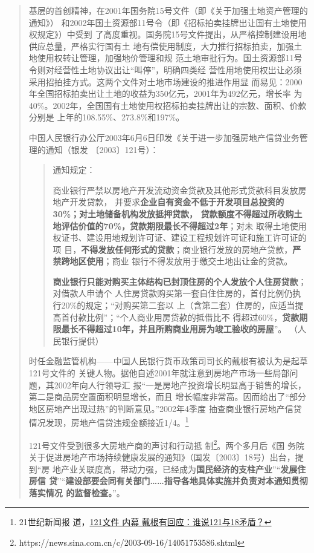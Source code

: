 \begin{quotation}
  基层的首创精神，在2001年国务院15号文件（即《关于加强土地资产管理的通知》）
  和2002年国土资源部11号令（即《招标拍卖挂牌出让国有土地使用权规定》）中受到
  了高度重视。国务院15号文件提出，从严格控制建设用地供应总量，严格实行国有土
  地有偿使用制度，大力推行招标拍卖，加强土地使用权转让管理，加强地价管理和规
  范土地审批行为。国土资源部11号令则对经营性土地协议出让“叫停”，明确四类经
  营性用地使用权出让必须采用招拍挂方式。这两个文件对土地市场建设的推进作用显
  而易见：2000年全国招标拍卖出让土地的收益为350亿元，2001年为492亿元，增长率
  为40\%。2002年，全国国有土地使用权招标拍卖挂牌出让的宗数、面积、价款分别是
  上年的108.55\%、273.8\%和197\%。



中国人民银行办公厅2003年6月6日印发《关于进一步加强房地产信贷业务管理的通知（银发
〔2003〕121号）：
\begin{quotation}
  通知规定：

  商业银行严禁以房地产开发流动资金贷款及其他形式贷款科目发放房地产开发贷款，
  并要求\textbf{企业自有资金不低于开发项目总投资的30\%；对土地储备机构发放抵押贷款，
    贷款额度不得超过所收购土地评估价值的70\%，贷款期限最长不得超过2年}；对未
  取得土地使用权证书、建设用地规划许可证、建设工程规划许可证和施工许可证的项
  目，\textbf{不得发放任何形式的贷款}；商业银行发放的房地产贷款，\textbf{严禁跨地区使用}；商业
  银行不得发放用于缴交土地出让金的贷款。

  \textbf{商业银行只能对购买主体结构已封顶住房的个人发放个人住房贷款}；对借款人申请个
  人住房贷款购买第一套自住住房的，首付比例仍执行20\%的规定；“对购买第二套以
  上（含第二套）住房的，应适当提高首付款比例”；“个人商业用房贷款的抵借比不
  得超过60\%，\textbf{贷款期限最长不得超过10年，并且所购商业用房为竣工验收的房屋}”。
  （人民银行提供）
\end{quotation}
时任金融监管机构——中国人民银行货币政策司司长的戴根有被认为是起草121号文件的
关键人物。据他自述2001年就注意到房地产市场一些局部问题，其2002年向人行领导汇
报“一是房地产投资增长明显高于销售的增长，第二是商品房空置面积明显增长，而且
增长幅度非常高。因而给出了“部分地区房地产出现过热”的判断意见。”2002年4季度
抽查商业银行房地产信贷情况发现，房地产信贷违规金额接近1/4。\footnote{21世纪新闻报
  道，\href{https://finance.sina.com.cn/x/20031101/1105501003.shtml}{121文件
    内幕 戴根有回应：谁说121与18矛盾？}}

121号文件受到很多大房地产商的声讨和行动抵
制\footnote{https://news.sina.com.cn/c/2003-09-16/14051753586.shtml}。两个多月后《国
务院关于促进房地产市场持续健康发展的通知》（国发〔2003〕18号）出台，提到“房
地产业关联度高，带动力强，已经成为\textbf{国民经济的支柱产业}”“\textbf{发展住房信
  贷}”“\textbf{建设部要会同有关部门……指导各地具体实施并负责对本通知贯彻落实情况
  的监督检查。}”。


\end{quotation}
